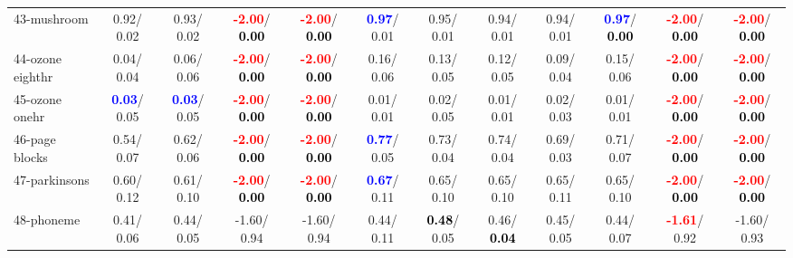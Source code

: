 \begin{table}[h]
\begin{center}
{\begin{tabular}{lc|c|c|c|c|c|c|c|c|c|c}
43-mushroom &   0.92/  0.02 &   0.93/  0.02 & \textcolor{red}{\textbf{ -2.00}}/\textcolor{black}{\textbf{  0.00}} & \textcolor{red}{\textbf{ -2.00}}/\textcolor{black}{\textbf{  0.00}} & \textcolor{blue}{\textbf{  0.97}}/  0.01 &   0.95/  0.01 &   0.94/  0.01 &   0.94/  0.01 & \textcolor{blue}{\textbf{  0.97}}/\textcolor{black}{\textbf{  0.00}} & \textcolor{red}{\textbf{ -2.00}}/\textcolor{black}{\textbf{  0.00}} & \textcolor{red}{\textbf{ -2.00}}/\textcolor{black}{\textbf{  0.00}} \\
44-ozone eighthr &   0.04/  0.04 &   0.06/  0.06 & \textcolor{red}{\textbf{ -2.00}}/\textcolor{black}{\textbf{  0.00}} & \textcolor{red}{\textbf{ -2.00}}/\textcolor{black}{\textbf{  0.00}} &   0.16/  0.06 &   0.13/  0.05 &   0.12/  0.05 &   0.09/  0.04 &   0.15/  0.06 & \textcolor{red}{\textbf{ -2.00}}/\textcolor{black}{\textbf{  0.00}} & \textcolor{red}{\textbf{ -2.00}}/\textcolor{black}{\textbf{  0.00}} \\
45-ozone onehr & \textcolor{blue}{\textbf{  0.03}}/  0.05 & \textcolor{blue}{\textbf{  0.03}}/  0.05 & \textcolor{red}{\textbf{ -2.00}}/\textcolor{black}{\textbf{  0.00}} & \textcolor{red}{\textbf{ -2.00}}/\textcolor{black}{\textbf{  0.00}} &   0.01/  0.01 &   0.02/  0.05 &   0.01/  0.01 &   0.02/  0.03 &   0.01/  0.01 & \textcolor{red}{\textbf{ -2.00}}/\textcolor{black}{\textbf{  0.00}} & \textcolor{red}{\textbf{ -2.00}}/\textcolor{black}{\textbf{  0.00}} \\
46-page blocks &   0.54/  0.07 &   0.62/  0.06 & \textcolor{red}{\textbf{ -2.00}}/\textcolor{black}{\textbf{  0.00}} & \textcolor{red}{\textbf{ -2.00}}/\textcolor{black}{\textbf{  0.00}} & \textcolor{blue}{\textbf{  0.77}}/  0.05 &   0.73/  0.04 &   0.74/  0.04 &   0.69/  0.03 &   0.71/  0.07 & \textcolor{red}{\textbf{ -2.00}}/\textcolor{black}{\textbf{  0.00}} & \textcolor{red}{\textbf{ -2.00}}/\textcolor{black}{\textbf{  0.00}} \\ \hline
47-parkinsons &   0.60/  0.12 &   0.61/  0.10 & \textcolor{red}{\textbf{ -2.00}}/\textcolor{black}{\textbf{  0.00}} & \textcolor{red}{\textbf{ -2.00}}/\textcolor{black}{\textbf{  0.00}} & \textcolor{blue}{\textbf{  0.67}}/  0.11 &   0.65/  0.10 &   0.65/  0.10 &   0.65/  0.11 &   0.65/  0.10 & \textcolor{red}{\textbf{ -2.00}}/\textcolor{black}{\textbf{  0.00}} & \textcolor{red}{\textbf{ -2.00}}/\textcolor{black}{\textbf{  0.00}} \\
48-phoneme &   0.41/  0.06 &   0.44/  0.05 &  -1.60/  0.94 &  -1.60/  0.94 &   0.44/  0.11 & \textcolor{black}{\textbf{  0.48}}/  0.05 &   0.46/\textcolor{black}{\textbf{  0.04}} &   0.45/  0.05 &   0.44/  0.07 & \textcolor{red}{\textbf{ -1.61}}/  0.92 &  -1.60/  0.93 \\

\end{tabular}}
\end{center}
\end{table}
